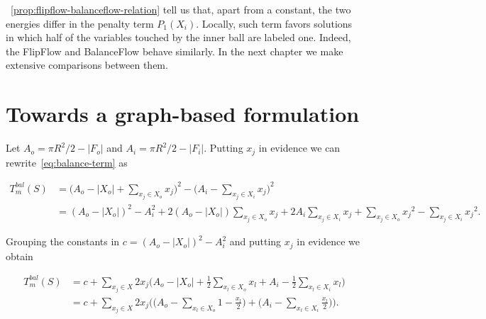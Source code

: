 ~\cref{prop:flipflow-balanceflow-relation} tell us that, apart  from a constant, the two energies differ in the penalty term $P_1(X_i)$. Locally, such term favors solutions in which half of the variables touched by the inner ball are labeled one. Indeed, the FlipFlow and BalanceFlow behave similarly. In the next chapter we make extensive comparisons between them.


\section{Towards a graph-based formulation}

Let $A_o = \pi R^2 / 2 - |F_o|$ and $A_i = \pi R^2/2 - |F_i|$. Putting $x_j$ in evidence we can rewrite~\cref{eq:balance-term} as

\begin{align*}
	T_{m}^{bal}(S) &= \Big(A_o - |X_o| + \sum_{x_j \in X_o}{x_j} \Big)^2 - \Big(A_i - \sum_{x_j \in X_i}{x_j}\Big)^2 \\
	&= (A_o - |X_o|)^2 - A_i^2 + 2(A_o - |X_o|)\sum_{x_j \in X_o}{x_j} + 2A_i\sum_{x_j \in X_i}{x_j} + \sum_{x_j \in X_o}{x_j}^2 - \sum_{x_j \in X_i}{x_j}^2.
\end{align*} 

Grouping the constants in $c=(A_o - |X_o|)^2 - A_i^2$ and putting $x_j$ in evidence we obtain

\begin{align}
	T_{m}^{bal}(S) 	&= c +\sum_{x_j \in X}{ 2x_j\Big( A_o - |X_o| + \frac{1}{2}\sum_{x_l \in X_o}{x_l} + A_i - \frac{1}{2}\sum_{x_l \in X_i}{x_l}\Big)} \nonumber \\
	&= c +\sum_{x_j \in X}{2x_j\Bigg( \Big(A_o - \sum_{x_l \in X_o}{1-\frac{x_l}{2}}\Big) + \Big(A_i - \sum_{x_l \in X_i}{\frac{x_l}{2}}\Big)\Bigg)}.
	\label{eq:xj-evidence}
\end{align}

